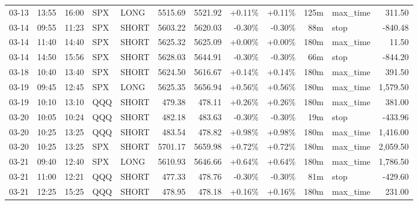 \documentclass[11pt,a4paper]{article}
\begin{document}
\begin{center}
\begin{longtable}{>{\color{txtmain}}l l l l l r r r r r >{\color{txtmain}}l r}
03-13 & 13:55 & 16:00 & SPX & LONG & 5515.69 & 5521.92 & \textcolor{wingreen}{+0.11\%} & \textcolor{wingreen}{+0.11\%} & 125m & max\_time & \textcolor{wingreen}{311.50} \\
03-14 & 09:55 & 11:23 & SPX & SHORT & 5603.22 & 5620.03 & \textcolor{lossred}{-0.30\%} & \textcolor{lossred}{-0.30\%} & 88m & stop & \textcolor{lossred}{-840.48} \\
03-14 & 11:40 & 14:40 & SPX & SHORT & 5625.32 & 5625.09 & \textcolor{wingreen}{+0.00\%} & \textcolor{wingreen}{+0.00\%} & 180m & max\_time & \textcolor{wingreen}{11.50} \\
03-14 & 14:50 & 15:56 & SPX & SHORT & 5628.03 & 5644.91 & \textcolor{lossred}{-0.30\%} & \textcolor{lossred}{-0.30\%} & 66m & stop & \textcolor{lossred}{-844.20} \\
03-18 & 10:40 & 13:40 & SPX & SHORT & 5624.50 & 5616.67 & \textcolor{wingreen}{+0.14\%} & \textcolor{wingreen}{+0.14\%} & 180m & max\_time & \textcolor{wingreen}{391.50} \\
03-19 & 09:45 & 12:45 & SPX & LONG & 5625.35 & 5656.94 & \textcolor{wingreen}{+0.56\%} & \textcolor{wingreen}{+0.56\%} & 180m & max\_time & \textcolor{wingreen}{1,579.50} \\
03-19 & 10:10 & 13:10 & QQQ & SHORT & 479.38 & 478.11 & \textcolor{wingreen}{+0.26\%} & \textcolor{wingreen}{+0.26\%} & 180m & max\_time & \textcolor{wingreen}{381.00} \\
03-20 & 10:05 & 10:24 & QQQ & SHORT & 482.18 & 483.63 & \textcolor{lossred}{-0.30\%} & \textcolor{lossred}{-0.30\%} & 19m & stop & \textcolor{lossred}{-433.96} \\
03-20 & 10:25 & 13:25 & QQQ & SHORT & 483.54 & 478.82 & \textcolor{wingreen}{+0.98\%} & \textcolor{wingreen}{+0.98\%} & 180m & max\_time & \textcolor{wingreen}{1,416.00} \\
03-20 & 10:25 & 13:25 & SPX & SHORT & 5701.17 & 5659.98 & \textcolor{wingreen}{+0.72\%} & \textcolor{wingreen}{+0.72\%} & 180m & max\_time & \textcolor{wingreen}{2,059.50} \\
03-21 & 09:40 & 12:40 & SPX & LONG & 5610.93 & 5646.66 & \textcolor{wingreen}{+0.64\%} & \textcolor{wingreen}{+0.64\%} & 180m & max\_time & \textcolor{wingreen}{1,786.50} \\
03-21 & 11:00 & 12:21 & QQQ & SHORT & 477.33 & 478.76 & \textcolor{lossred}{-0.30\%} & \textcolor{lossred}{-0.30\%} & 81m & stop & \textcolor{lossred}{-429.60} \\
03-21 & 12:25 & 15:25 & QQQ & SHORT & 478.95 & 478.18 & \textcolor{wingreen}{+0.16\%} & \textcolor{wingreen}{+0.16\%} & 180m & max\_time & \textcolor{wingreen}{231.00} \\

\end{longtable}
\end{center}
\end{document}
